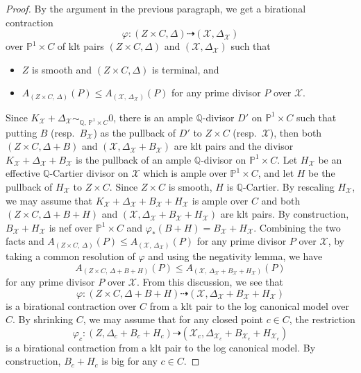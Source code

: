 \documentclass[12pt,twoside]{amsart}
\theoremstyle{definition}
\begin{document}
\begin{proof}
By the argument in the previous paragraph, we get a birational contraction 
$$\varphi \colon (Z \times C, \Delta) \dashrightarrow (\mathcal{X},\Delta_{\mathcal{X}})$$
over $\mathbb{P}^{1}\times C$ of klt pairs $(Z \times C, \Delta)$ and $(\mathcal{X},\Delta_{\mathcal{X}})$ such that 
\begin{itemize}
\item
$Z$ is smooth and $(Z \times C, \Delta)$ is terminal, and
\item
$A_{(Z \times C, \,\Delta)}(P) \leq A_{(\mathcal{X}, \, \Delta_{\mathcal{X}})}(P)$ for any prime divisor $P$ over $\mathcal{X}$. 
\end{itemize}  
Since $K_{\mathcal{X}}+\Delta_{\mathcal{X}} \sim_{\mathbb{Q},\,\mathbb{P}^{1}\times C}0$, there is an ample $\mathbb{Q}$-divisor $D'$ on $\mathbb{P}^{1}\times C$ such that putting $B$ (resp.~$B_{\mathcal{X}}$) as the pullback of $D'$ to $Z\times C$ (resp.~$\mathcal{X}$), then both $(Z \times C, \Delta+B)$ and $(\mathcal{X},\Delta_{\mathcal{X}}+B_{\mathcal{X}})$
 are klt pairs and the divisor $K_{\mathcal{X}}+\Delta_{\mathcal{X}} +B_{\mathcal{X}}$ is the pullback of an ample $\mathbb{Q}$-divisor on $\mathbb{P}^{1}\times C$. 
Let $H_{\mathcal{X}}$ be an effective $\mathbb{Q}$-Cartier divisor on $\mathcal{X}$ which is ample over $\mathbb{P}^{1}\times C$, and let $H$ be the pullback of $H_{\mathcal{X}}$ to $Z\times C$. 
Since $Z \times C$ is smooth, $H$ is $\mathbb{Q}$-Cartier. 
By rescaling $H_{\mathcal{X}}$, we may assume that $K_{\mathcal{X}}+\Delta_{\mathcal{X}} +B_{\mathcal{X}}+H_{\mathcal{X}}$ is ample over $C$ and both $(Z \times C, \Delta+B+H)$ and $(\mathcal{X},\Delta_{\mathcal{X}}+B_{\mathcal{X}}+H_{\mathcal{X}})$ are klt pairs. 
By construction, $B_{\mathcal{X}}+H_{\mathcal{X}}$ is nef over $\mathbb{P}^{1}\times C$ and $\varphi_{*}(B+H)=B_{\mathcal{X}}+H_{\mathcal{X}}$. 
Combining the two facts and $A_{(Z \times C, \,\Delta)}(P) \leq A_{(\mathcal{X}, \, \Delta_{\mathcal{X}})}(P)$ for any prime divisor $P$ over $\mathcal{X}$, by taking a common resolution of $\varphi$ and using the negativity lemma, we have 
$$A_{(Z \times C, \,\Delta+B+H)}(P) \leq A_{(\mathcal{X}, \, \Delta_{\mathcal{X}}+B_{\mathcal{X}}+H_{\mathcal{X}})}(P)$$
for any prime divisor $P$ over $\mathcal{X}$. 
From this discussion, we see that 
$$\varphi \colon (Z \times C, \Delta+B+H) \dashrightarrow (\mathcal{X},\Delta_{\mathcal{X}}+B_{\mathcal{X}}+H_{\mathcal{X}})$$
is a birational contraction over $C$ from a klt pair to the log canonical model over $C$. 
By shrinking $C$, we may assume that for any closed point $c \in C$, the restriction 
$$\varphi_{c} \colon (Z, \Delta_{c}+B_{c}+H_{c}) \dashrightarrow (\mathcal{X}_{c},\Delta_{\mathcal{X}_{c}}+B_{\mathcal{X}_{c}}+H_{\mathcal{X}_{c}})$$
is a birational contraction  from a klt pair to the log canonical model. 
By construction, $B_{c}+H_{c}$ is big for any $c \in C$. 


\end{proof}
\end{document}
